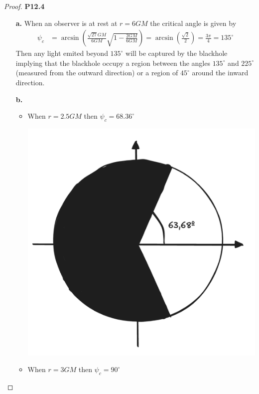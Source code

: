 \documentclass[11pt]{article}
\theoremstyle{definition}
\begin{document}
\begin{proof}{\textbf{P12.4}}
\begin{itemize}
    \item [\textbf{a.}] When an observer is at rest at $r = 6GM$ the 
    critical angle is given by 
    \begin{align*}
        \psi_c &= \arcsin(\frac{\sqrt{27}GM}{6GM}\sqrt{1 - \frac{2GM}{6GM}})
        = \arcsin(\frac{\sqrt{2}}{2}) = \frac{3\pi}{4} = 135^\circ
    \end{align*}
    Then any light emited beyond $135^\circ$ will be captured by the blackhole
    implying that the blackhole occupy a region between the angles $135^\circ$ and
    $225^\circ$ (measured from the outward direction) or a region of $45^\circ$
    around the inward direction.
    \item [\textbf{b.}]
    \begin{itemize}
        \item When $r = 2.5GM$ then $\psi_c = 68.36^\circ$
        \begin{center}
            \includegraphics[scale=0.3]{ch12-p12.4-a.png}
        \end{center}
        \item When $r = 3GM$ then $\psi_c = 90^\circ$
        \begin{center}

\end{center}
\end{itemize}
\end{itemize}
\end{proof}
\end{document}
